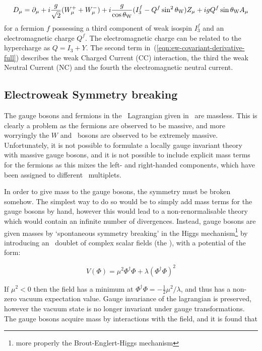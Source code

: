 \begin{equation}
D_{\mu}  =  \partial_{\mu} + i \frac{g}{\sqrt{2}} ( W^{+}_{\mu} + W^{-}_{\mu} ) 
+ i \frac{g}{\cos{\ensuremath{\theta_{\mathrm{W}}}}} ( I^{f}_{3} - Q^{f} \sin^{2}{\theta_{\mathrm{W}}} ) Z_{\mu}
+ i g Q^{f} \sin{\ensuremath{\theta_{\mathrm{W}}}} A_{\mu}
\label{eqn:ew-covariant-derivative-full}
\end{equation}
for a fermion $f$ possessing a third component of weak isospin $I_{3}^{f}$
and an electromagnetic charge $Q^{f}$. The electromagnetic charge can be related
to the hypercharge as $Q = I_{3} + Y$. The second term
in~(\ref{eqn:ew-covariant-derivative-full}) describes the weak Charged Current (CC)
interaction, the third the weak Neutral Current (NC) and the fourth the
electromagnetic neutral current.

\subsection{Electroweak Symmetry breaking}

The gauge bosons and fermions in the \ew\ Lagrangian given
in~ are massless. This is clearly a problem as the fermions
are observed to be massive, and more worryingly the $W$ and \Z\ bosons are
observed to be extremely massive. Unfortunately, it is not possible to formulate a locally gauge invariant theory with massive
gauge bosons, and it is not possible to include explicit mass terms for the
fermions as this mixes the left- and right-handed components, which have been
assigned to different \sutwo\ multiplets. 

In order to give
mass to the gauge bosons, the symmetry must be broken somehow. The simplest way
to do so would be to simply add mass terms for the gauge bosons by hand, however
this would lead to a non-renormalisable theory which would contain an infinite
number of divergences. Instead, gauge bosons are given masses by `spontaneous
symmetry breaking' in the Higgs mechanism\footnote{more properly the Brout-Englert-Higgs
mechanism} by introducing an \sutwo\ doublet of complex scalar fields (the ), with a potential of the form:

\begin{equation}
V(\Phi) =  \mu^{2}\Phi^{\dagger}\Phi + \lambda(\Phi^{\dagger}\Phi)^{2}
\end{equation}

If $\mu^{2} < 0$ then the field has a minimum at $\Phi^{\dagger}\Phi = -
\frac{1}{2} \mu^{2}/\lambda$, and thus has a non-zero vacuum expectation value. 
Gauge invariance of the lagrangian is preserved, however the vacuum state is no
longer invariant under gauge transformations.
The gauge bosons acquire mass by interactions with the field, and it is found
that

